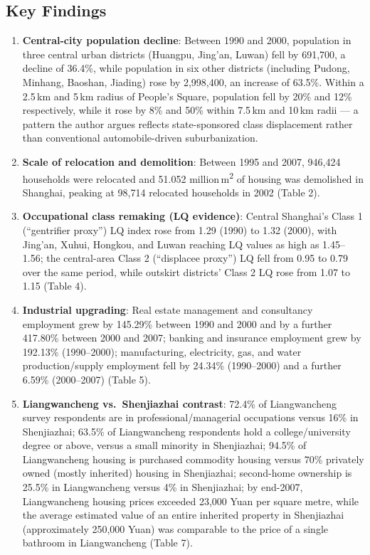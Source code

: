 \subsection*{Key Findings}

\begin{enumerate}
  \item \textbf{Central-city population decline}: Between 1990 and 2000, population in three central urban districts (Huangpu, Jing'an, Luwan) fell by 691,700, a decline of 36.4\%, while population in six other districts (including Pudong, Minhang, Baoshan, Jiading) rose by 2,998,400, an increase of 63.5\%. Within a 2.5\,km and 5\,km radius of People's Square, population fell by 20\% and 12\% respectively, while it rose by 8\% and 50\% within 7.5\,km and 10\,km radii --- a pattern the author argues reflects state-sponsored class displacement rather than conventional automobile-driven suburbanization.
  \item \textbf{Scale of relocation and demolition}: Between 1995 and 2007, 946,424 households were relocated and 51.052 million\,m\textsuperscript{2} of housing was demolished in Shanghai, peaking at 98,714 relocated households in 2002 (Table 2).
  \item \textbf{Occupational class remaking (LQ evidence)}: Central Shanghai's Class 1 (``gentrifier proxy'') LQ index rose from 1.29 (1990) to 1.32 (2000), with Jing'an, Xuhui, Hongkou, and Luwan reaching LQ values as high as 1.45--1.56; the central-area Class 2 (``displacee proxy'') LQ fell from 0.95 to 0.79 over the same period, while outskirt districts' Class 2 LQ rose from 1.07 to 1.15 (Table 4).
  \item \textbf{Industrial upgrading}: Real estate management and consultancy employment grew by 145.29\% between 1990 and 2000 and by a further 417.80\% between 2000 and 2007; banking and insurance employment grew by 192.13\% (1990--2000); manufacturing, electricity, gas, and water production/supply employment fell by 24.34\% (1990--2000) and a further 6.59\% (2000--2007) (Table 5).
  \item \textbf{Liangwancheng vs.\ Shenjiazhai contrast}: 72.4\% of Liangwancheng survey respondents are in professional/managerial occupations versus 16\% in Shenjiazhai; 63.5\% of Liangwancheng respondents hold a college/university degree or above, versus a small minority in Shenjiazhai; 94.5\% of Liangwancheng housing is purchased commodity housing versus 70\% privately owned (mostly inherited) housing in Shenjiazhai; second-home ownership is 25.5\% in Liangwancheng versus 4\% in Shenjiazhai; by end-2007, Liangwancheng housing prices exceeded 23,000 Yuan per square metre, while the average estimated value of an entire inherited property in Shenjiazhai (approximately 250,000 Yuan) was comparable to the price of a single bathroom in Liangwancheng (Table 7).

\end{enumerate}
